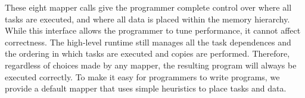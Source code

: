 






These eight mapper calls give the programmer complete control over where all tasks are executed, and
where all data is placed within the memory hierarchy.  While this interface allows the programmer
to tune performance, it cannot affect correctness.  The high-level runtime still manages all the task dependences and the
ordering in which tasks are executed and copies are performed.  Therefore, regardless of choices
made by any mapper, the resulting program will always be executed correctly.
To make it easy for programmers to write programs, we provide a default
 mapper that uses simple heuristics to place tasks and data.  

